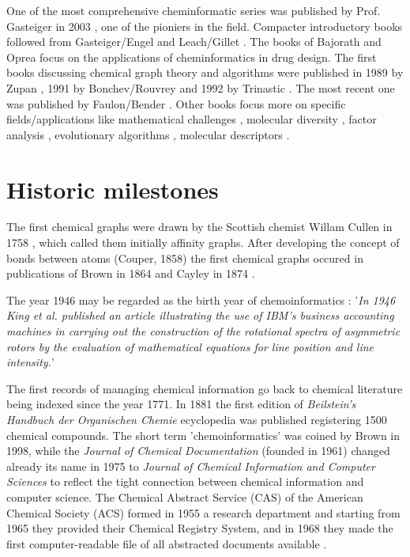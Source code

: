 \documentclass{sig-alternate}
\begin{document}
One of the most comprehensive cheminformatic series was published by
Prof. Gasteiger in 2003 \cite{Gasteiger2003}, one of the pioniers in
the field.  Compacter introductory books followed from Gasteiger/Engel
\cite{gasteigerengel2003} and Leach/Gillet \cite{leachgillet2007}.
The books of Bajorath \cite{Bajorath2004} and Oprea \cite{oprea2005}
focus on the applications of cheminformatics in drug design.  The
first books discussing chemical graph theory and algorithms were
published in 1989 by Zupan \cite{zupan1989}, 1991 by Bonchev/Rouvrey
\cite{bonchevrouvrey1991,bonchevrouvrey2003} and 1992 by Trinastic
\cite{Trinajstic1992}.  The most recent one was published by
Faulon/Bender \cite{faulon2010}.  Other books focus more on specific
fields/applications like mathematical challenges
\cite{mathchallenges1995}, molecular diversity
\cite{moleculardiversity1999}, factor analysis \cite{Malinowski2002},
evolutionary algorithms \cite{clark2000}, molecular descriptors
\cite{todeschini2000}.

\section{Historic milestones}
The first chemical graphs were drawn by the Scottish chemist Willam Cullen in 1758 \cite{bonchevrouvrey1991}, which called them initially affinity graphs.
After developing the concept of bonds between atoms (Couper, 1858) the first chemical graphs occured in publications 
of Brown in 1864 and Cayley in 1874 \cite{bonchevrouvrey1991,brown2009}. 

The year 1946 may be regarded as the birth year of chemoinformatics \cite{Chen2006}: '\textit{In 1946 King et al.\cite{kct1946} published an article illustrating 
the use of IBM's business accounting machines in carrying out the construction of the rotational spectra of asymmetric rotors
by the evaluation of mathematical equations for line position and line intensity.}'

The first records of managing chemical information go back to chemical literature being indexed since the year 1771.
In 1881 the first edition of \textit{Beilstein's Handbuch der Organischen Chemie} ecyclopedia was 
published \cite{polanski2009} registering 1500 chemical compounds. The short term 'chemoinformatics' was coined by Brown 
in 1998\cite{brown1998}, while the \textit{Journal of Chemical Documentation} (founded in 1961) changed already its name in 1975 to 
\textit{Journal of Chemical Information and Computer Sciences} to reflect the tight connection between chemical information 
and computer science. The Chemical Abstract Service (CAS) of the American Chemical Society (ACS) formed in 1955 a research department
and starting from 1965 they provided their Chemical Registry System, and in 1968 they made the first computer-readable file of all
abstracted documents available \cite{Chen2006}.
\end{document}
